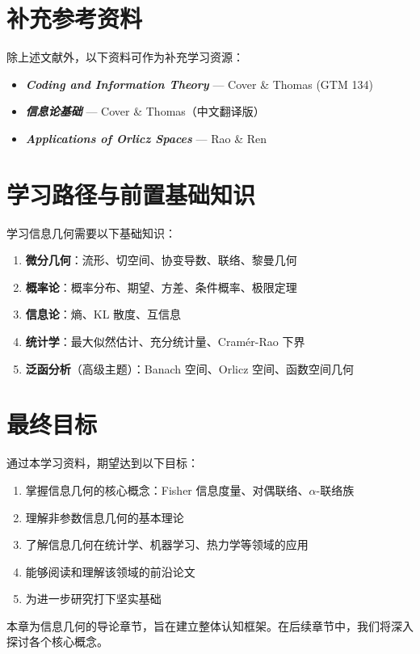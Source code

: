 \section{补充参考资料}

除上述文献外，以下资料可作为补充学习资源：

\begin{itemize}
    \item \textbf{\textit{Coding and Information Theory}} — Cover \& Thomas (GTM 134)
    \item \textbf{\textit{信息论基础}} — Cover \& Thomas（中文翻译版）
    \item \textbf{\textit{Applications of Orlicz Spaces}} — Rao \& Ren
\end{itemize}

\section{学习路径与前置基础知识}

学习信息几何需要以下基础知识：

\begin{enumerate}
    \item \textbf{微分几何}：流形、切空间、协变导数、联络、黎曼几何
    \item \textbf{概率论}：概率分布、期望、方差、条件概率、极限定理
    \item \textbf{信息论}：熵、KL 散度、互信息
    \item \textbf{统计学}：最大似然估计、充分统计量、Cramér-Rao 下界
    \item \textbf{泛函分析}（高级主题）：Banach 空间、Orlicz 空间、函数空间几何
\end{enumerate}

\section{最终目标}

通过本学习资料，期望达到以下目标：

\begin{enumerate}
    \item 掌握信息几何的核心概念：Fisher 信息度量、对偶联络、$\alpha$-联络族
    \item 理解非参数信息几何的基本理论
    \item 了解信息几何在统计学、机器学习、热力学等领域的应用
    \item 能够阅读和理解该领域的前沿论文
    \item 为进一步研究打下坚实基础
\end{enumerate}

\begin{Remark}
    本章为信息几何的导论章节，旨在建立整体认知框架。在后续章节中，我们将深入探讨各个核心概念。
\end{Remark}
